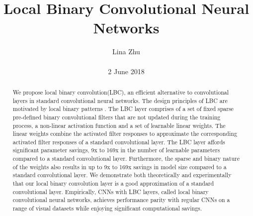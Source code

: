 \documentclass[10pt,twocolumn,letterpaper]{article}
\title{\textbf{Local Binary Convolutional Neural Networks}}
\author{Lina Zhu\\\\2  June 2018}
\begin{document}

\maketitle
\begin{abstract}
We propose local binary convolution(LBC), an efficient alternative to convolutional layers in standard convolutional neural networks. The design principles of LBC are motivated by local binary patterns . The LBC layer comprises of a set of fixed sparse pre-defined binary convolutional filters that are not updated during the training process, a non-linear activation function and a set of learnable linear weights. The linear weights combine the activated filter responses to approximate the corresponding activated filter responses of a standard convolutional layer. The LBC layer affords significant parameter savings, 9x to 169x in the number of learnable parameters compared to a standard convolutional layer. Furthermore, the sparse and binary nature of the weights also results in up to 9x to 169x savings in model size compared to a standard convolutional layer. We demonstrate both theoretically and experimentally that our local binary convolution layer is a good approximation of a
standard convolutional layer. Empirically, CNNs with LBC layers, called local binary convolutional neural networks, achieves performance parity with regular CNNs on a range of visual datasets while enjoying significant computational savings.
\end{abstract}
\end{document}
